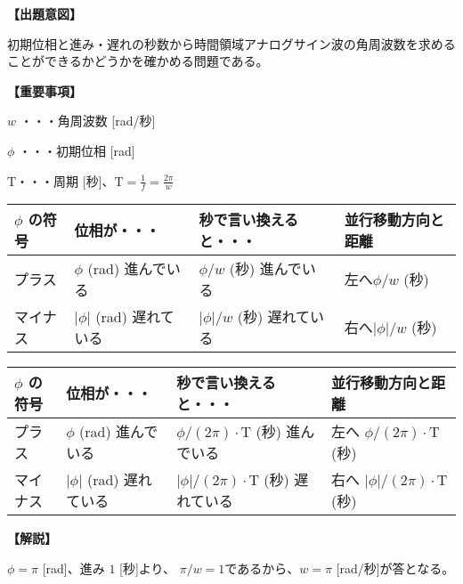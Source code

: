 \noindent \textbf{【出題意図】}

\noindent 初期位相と進み・遅れの秒数から時間領域アナログサイン波の角周波数を求めることができるかどうかを確かめる問題である。

\vspace{1em}
\noindent \textbf{【重要事項】}

\bigskip
\noindent $w$ ・・・角周波数 [rad/秒]

\bigskip
\noindent $\phi$ ・・・初期位相 [rad]

\bigskip
$\textrm{T}$・・・周期 [秒]、$\textrm{T} = \frac{1}{f} = \frac{2\pi}{w}$

\begin{center}
\begin{tabularx}{0.9\fbwidth}{|X|X|X|X|}
\hline
$\phi$ の符号&  位相が・・・   & 秒で言い換えると・・・   & 並行移動方向と距離 \\
\hline
プラス &  $\phi$ (rad) 進んでいる & $\phi/w$ (秒) 進んでいる & 左へ$\phi/w$ (秒) \\
\hline
マイナス &  $|\phi|$ (rad) 遅れている & $|\phi|/w$ (秒) 遅れている & 右へ$|\phi|/w$ (秒) \\
\hline
\end{tabularx}

\medskip
\begin{tabularx}{0.9\fbwidth}{|X|X|X|X|}
\hline
$\phi$ の符号&  位相が・・・   & 秒で言い換えると・・・   & 並行移動方向と距離 \\
\hline
プラス &  $\phi$ (rad) 進んでいる & $\phi/(2\pi) \cdot \textrm{T}$ (秒) 進んでいる & 左へ $\phi/(2\pi) \cdot \textrm{T}$ (秒) \\
\hline
マイナス &  $|\phi|$ (rad) 遅れている & $|\phi|/(2\pi) \cdot \textrm{T}$ (秒) 遅れている & 右へ $|\phi|/(2\pi) \cdot \textrm{T}$ (秒) \\
\hline
\end{tabularx}
\end{center}

\vspace{1em}
\noindent \textbf{【解説】}

\noindent $\phi = \pi$ [rad]、進み $1$ [秒]より、 $\pi/w = 1$であるから、$w = \pi$ [rad/秒]が答となる。
